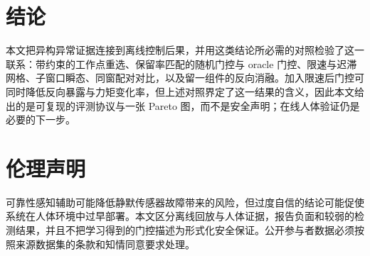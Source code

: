 \documentclass[UTF8]{ctexart}
\begin{document}
\section{结论}

本文把异构异常证据连接到离线控制后果，并用这类结论所必需的对照检验了这一联系：带约束的工作点重选、保留率匹配的随机门控与 oracle 门控、限速与迟滞网格、子窗口瞬态、同窗配对对比，以及留一组件的反向消融。加入限速后门控可同时降低反向暴露与力矩变化率，但上述对照界定了这一结果的含义，因此本文给出的是可复现的评测协议与一张 Pareto 图，而不是安全声明；在线人体验证仍是必要的下一步。

\section{伦理声明}

可靠性感知辅助可能降低静默传感器故障带来的风险，但过度自信的结论可能促使系统在人体环境中过早部署。本文区分离线回放与人体证据，报告负面和较弱的检测结果，并且不把学习得到的门控描述为形式化安全保证。公开参与者数据必须按照来源数据集的条款和知情同意要求处理。



\end{document}
